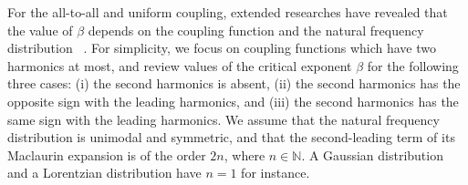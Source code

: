 For the all-to-all and uniform coupling, extended researches have revealed that the value of $\beta$
depends on the coupling function and the natural frequency distribution~
\cite{kuramoto1975,strogatz2000,chiba2015,daido2015,basnarkov2007,pazo2005,daido1990,crawford1995,chiba2011,pikovsky2013,komarov2014}.
For simplicity, we focus on coupling functions which have two harmonics at most,
and review values of the critical exponent $\beta$ for the following three cases:
(i) the second harmonics is absent,
(ii) the second harmonics has the opposite sign with the leading harmonics,
and (iii) the second harmonics has the same sign with the leading harmonics.
We assume that the natural frequency distribution is unimodal and symmetric,
and that the second-leading term of its Maclaurin expansion is of the order $2n$, where $n\in\mathbb{N}$.
A Gaussian distribution and a Lorentzian distribution have $n=1$ for instance.


%
%

